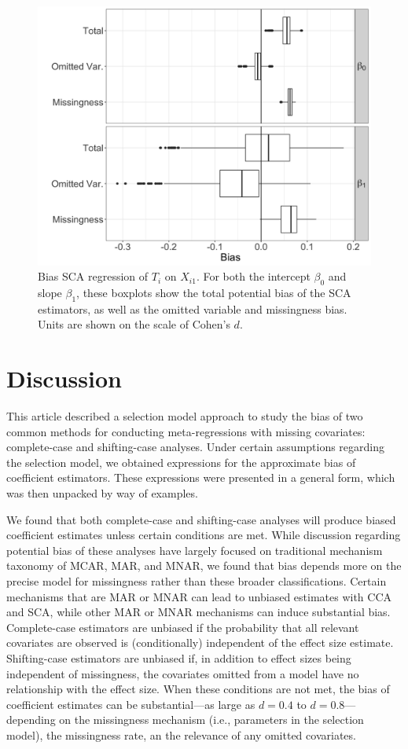 \documentclass[
]{article}
\begin{document}
\begin{figure}
\begin{center}
\includegraphics[width = .8\textwidth]{../../writeup/cca_paper/graphics/bias_boxplot.jpg}
\end{center}
\caption{Bias SCA regression of $T_i$ on $X_{i1}$. For both the intercept $\beta_0$ and slope $\beta_1$, these boxplots show the total potential bias of the SCA estimators, as well as the omitted variable and missingness bias. Units are shown on the scale of Cohen's $d$.}
\label{fig:bias-box}
\end{figure}

\hypertarget{discussion}{%
\section{Discussion}\label{discussion}}

This article described a selection model approach to study the bias of two common methods for conducting meta-regressions with missing covariates: complete-case and shifting-case analyses.
Under certain assumptions regarding the selection model, we obtained expressions for the approximate bias of coefficient estimators.
These expressions were presented in a general form, which was then unpacked by way of examples.

We found that both complete-case and shifting-case analyses will produce biased coefficient estimates unless certain conditions are met.
While discussion regarding potential bias of these analyses have largely focused on traditional mechanism taxonomy of MCAR, MAR, and MNAR, we found that bias depends more on the precise model for missingness rather than these broader classifications.
Certain mechanisms that are MAR or MNAR can lead to unbiased estimates with CCA and SCA, while other MAR or MNAR mechanisms can induce substantial bias.
Complete-case estimators are unbiased if the probability that all relevant covariates are observed is (conditionally) independent of the effect size estimate.
Shifting-case estimators are unbiased if, in addition to effect sizes being independent of missingness, the covariates omitted from a model have no relationship with the effect size.
When these conditions are not met, the bias of coefficient estimates can be substantial---as large as \(d = 0.4\) to \(d = 0.8\)---depending on the missingness mechanism (i.e., parameters in the selection model), the missingness rate, an the relevance of any omitted covariates.
\end{document}
